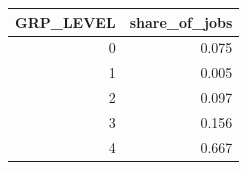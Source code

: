 \begin{tabular}{rr}
\toprule
GRP_LEVEL & share_of_jobs \\
\midrule
0 & 0.075 \\
1 & 0.005 \\
2 & 0.097 \\
3 & 0.156 \\
4 & 0.667 \\
\bottomrule
\end{tabular}

